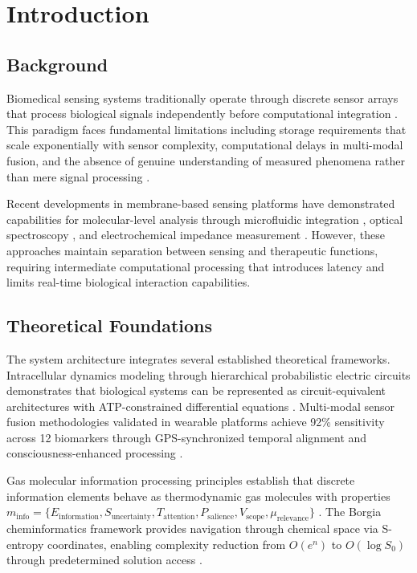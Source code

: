 \documentclass[12pt,a4paper]{article}
\begin{document}
\section{Introduction}

\subsection{Background}

Biomedical sensing systems traditionally operate through discrete sensor arrays that process biological signals independently before computational integration \cite{heikenfeld2018}. This paradigm faces fundamental limitations including storage requirements that scale exponentially with sensor complexity, computational delays in multi-modal fusion, and the absence of genuine understanding of measured phenomena rather than mere signal processing \cite{gao2016,yang2020}.

Recent developments in membrane-based sensing platforms have demonstrated capabilities for molecular-level analysis through microfluidic integration \cite{bandodkar2019}, optical spectroscopy \cite{kim2017}, and electrochemical impedance measurement \cite{lee2016}. However, these approaches maintain separation between sensing and therapeutic functions, requiring intermediate computational processing that introduces latency and limits real-time biological interaction capabilities.

\subsection{Theoretical Foundations}

The system architecture integrates several established theoretical frameworks. Intracellular dynamics modeling through hierarchical probabilistic electric circuits demonstrates that biological systems can be represented as circuit-equivalent architectures with ATP-constrained differential equations \cite{sachikonye2024intracellular}. Multi-modal sensor fusion methodologies validated in wearable platforms achieve 92\% sensitivity across 12 biomarkers through GPS-synchronized temporal alignment and consciousness-enhanced processing \cite{sachikonye2024sensor}.

Gas molecular information processing principles establish that discrete information elements behave as thermodynamic gas molecules with properties $m_{\text{info}} = \{E_{\text{information}}, S_{\text{uncertainty}}, T_{\text{attention}}, P_{\text{salience}}, V_{\text{scope}}, \mu_{\text{relevance}}\}$ \cite{sachikonye2024perception}. The Borgia cheminformatics framework provides navigation through chemical space via S-entropy coordinates, enabling complexity reduction from $O(e^n)$ to $O(\log S_0)$ through predetermined solution access \cite{sachikonye2024borgia}.
\end{document}

